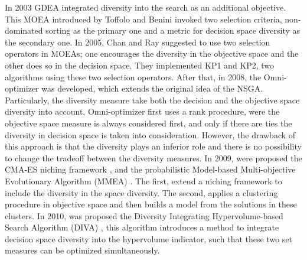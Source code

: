 In 2003 GDEA \cite{toffolo2003genetic} integrated diversity into the search as an additional objective.
%
This MOEA introduced by Toffolo and Benini invoked two selection criteria, non-dominated sorting as the primary one and a metric for decision space diversity as the secondary one.
%
In 2005, Chan and Ray \cite{chan2005evolutionary} suggested to use two selection operators in MOEAs; one encourages the diversity in the objective space and the other does so in the decision space.
%
They implemented KP1 and KP2, two algorithms using these two selection operators.
%
After that, in 2008, the Omni-optimizer \cite{deb2008omni} was developed, which extends the original idea of the NSGA. 
%
Particularly, the diversity measure take both the decision and the objective space diversity into account, Omni-optimizer first uses a rank procedure, were the objective space measure is always considered first, and only if there are ties the diversity in decision space is taken into consideration.
%
However, the drawback of this approach is that the diversity plays an inferior role and there is no possibility to change the tradeoff between the diversity measures.
%
In 2009, were proposed the  CMA-ES niching framework \cite{shir2009enhancing} , and the probabilistic Model-based Multi-objective Evolutionary Algorithm (MMEA)\cite{zhou2009approximating} .
%
The first, extend a niching framework to include the diversity in the space diversity.
%
The second, applies a clustering procedure in objective space and then builds a model from the solutions in these clusters.
%
In 2010, was proposed the Diversity Integrating Hypervolume-based Search Algorithm (DIVA) \cite{ulrich2010integrating}, this algorithm introduces a method to integrate decision space diversity into the hypervolume indicator, such that these two set measures can be optimized simultaneously.
